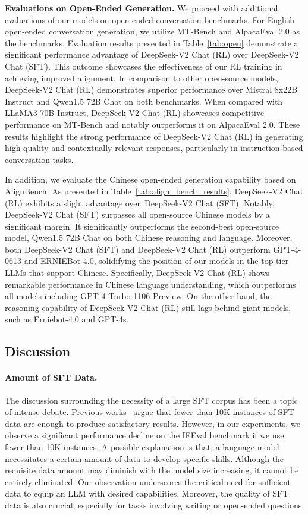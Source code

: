 \textbf{Evaluations on Open-Ended Generation.} We proceed with additional evaluations of our models on open-ended conversation benchmarks. For English open-ended conversation generation, we utilize MT-Bench and AlpacaEval 2.0 as the benchmarks. Evaluation results presented in Table~\ref{tab:open} demonstrate a significant performance advantage of DeepSeek-V2 Chat (RL) over DeepSeek-V2 Chat (SFT). This outcome showcases the effectiveness of our RL training in achieving improved alignment. In comparison to other open-source models, DeepSeek-V2 Chat (RL) demonstrates superior performance over Mistral 8x22B Instruct and Qwen1.5 72B Chat on both benchmarks. When compared with LLaMA3 70B Instruct, DeepSeek-V2 Chat (RL) showcases competitive performance on MT-Bench and notably outperforms it on AlpacaEval 2.0. These results highlight the strong performance of DeepSeek-V2 Chat (RL) in generating high-quality and contextually relevant responses, particularly in instruction-based conversation tasks.

In addition, we evaluate the Chinese open-ended generation capability based on AlignBench. As presented in Table~\ref{tab:align_bench_results}, DeepSeek-V2 Chat (RL) exhibits a slight advantage over~DeepSeek-V2 Chat (SFT). Notably, DeepSeek-V2 Chat (SFT) surpasses all open-source Chinese models by a significant margin. It significantly outperforms the second-best open-source model, Qwen1.5 72B Chat on both Chinese reasoning and language. Moreover, both DeepSeek-V2 Chat (SFT) and DeepSeek-V2 Chat (RL) outperform GPT-4-0613 and ERNIEBot 4.0, solidifying the position of our models in the top-tier LLMs that support Chinese. Specifically, DeepSeek-V2 Chat (RL) shows remarkable performance in Chinese language understanding, which outperforms all models including GPT-4-Turbo-1106-Preview. On the other hand, the reasoning capability of DeepSeek-V2 Chat (RL) still lags behind giant models, such as Erniebot-4.0 and GPT-4s. 

\subsection{Discussion}

\paragraph{Amount of SFT Data.} The discussion surrounding the necessity of a large SFT corpus has been a topic of intense debate. Previous works~\citep{yi, lima} argue that fewer than 10K instances of SFT data are enough to produce satisfactory results. However, in our experiments, we observe a significant performance decline on the IFEval benchmark if we use fewer than 10K instances. A possible explanation is that, a language model necessitates a certain amount of data to develop specific skills. Although the requisite data amount may diminish with the model size increasing, it cannot be entirely eliminated. Our observation underscores the critical need for sufficient data to equip an LLM with desired capabilities. Moreover, the quality of SFT data is also crucial, especially for tasks involving writing or open-ended questions. 

